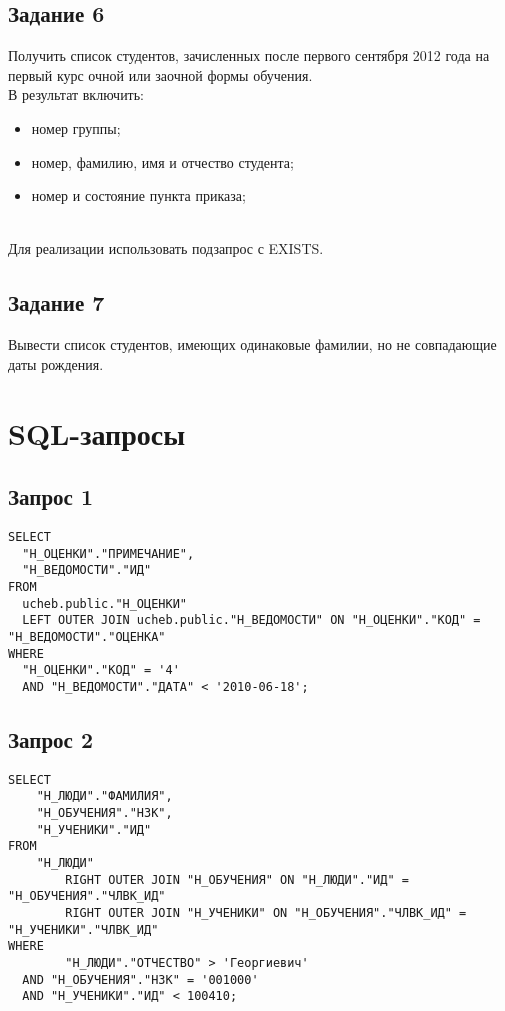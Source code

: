 \documentclass{article}
\begin{document}
\subsection{Задание 6}
Получить список студентов, зачисленных после первого сентября 2012 года на первый курс очной или заочной формы обучения. \\
В результат включить:
\begin{itemize}
    \item номер группы;
    \item номер, фамилию, имя и отчество студента;
    \item номер и состояние пункта приказа;
\end{itemize}
\\
Для реализации использовать подзапрос с EXISTS.


\subsection{Задание 7}
Вывести список студентов, имеющих одинаковые фамилии, но не совпадающие даты рождения.

\section{SQL-запросы}

\subsection{Запрос 1}
\begin{verbatim}
SELECT 
  "Н_ОЦЕНКИ"."ПРИМЕЧАНИЕ", 
  "Н_ВЕДОМОСТИ"."ИД" 
FROM 
  ucheb.public."Н_ОЦЕНКИ" 
  LEFT OUTER JOIN ucheb.public."Н_ВЕДОМОСТИ" ON "Н_ОЦЕНКИ"."КОД" = "Н_ВЕДОМОСТИ"."ОЦЕНКА" 
WHERE 
  "Н_ОЦЕНКИ"."КОД" = '4' 
  AND "Н_ВЕДОМОСТИ"."ДАТА" < '2010-06-18';
\end{verbatim}

\subsection{Запрос 2}
\begin{verbatim}
SELECT
    "Н_ЛЮДИ"."ФАМИЛИЯ",
    "Н_ОБУЧЕНИЯ"."НЗК",
    "Н_УЧЕНИКИ"."ИД"
FROM
    "Н_ЛЮДИ"
        RIGHT OUTER JOIN "Н_ОБУЧЕНИЯ" ON "Н_ЛЮДИ"."ИД" = "Н_ОБУЧЕНИЯ"."ЧЛВК_ИД"
        RIGHT OUTER JOIN "Н_УЧЕНИКИ" ON "Н_ОБУЧЕНИЯ"."ЧЛВК_ИД" = "Н_УЧЕНИКИ"."ЧЛВК_ИД"
WHERE
        "Н_ЛЮДИ"."ОТЧЕСТВО" > 'Георгиевич'
  AND "Н_ОБУЧЕНИЯ"."НЗК" = '001000'
  AND "Н_УЧЕНИКИ"."ИД" < 100410;
\end{verbatim}
\end{document}
